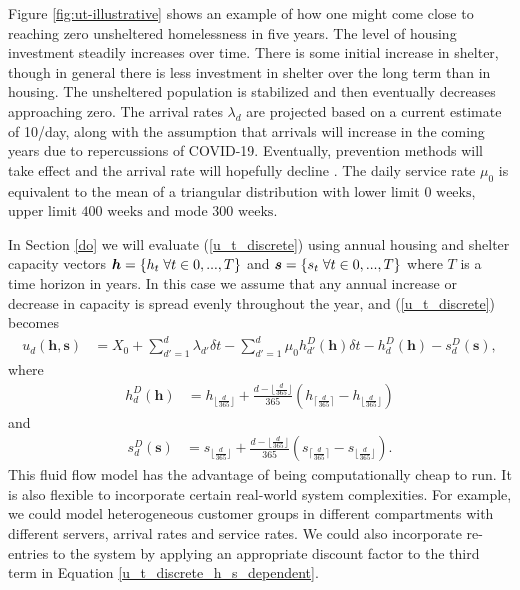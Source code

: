 \documentclass[12pt,a4paper]{article}
\begin{document}
Figure \ref{fig:ut-illustrative} shows an example of how one might come close to reaching zero unsheltered homelessness in five years.  The level of housing investment steadily increases over time.  There is some initial increase in shelter, though in general there is less investment in shelter over the long term than in housing.  The unsheltered population is stabilized and then eventually decreases approaching zero.  The arrival rates $\lambda_d$ are projected based on a current estimate of 10/day, along with the assumption that arrivals will increase in the coming years due to repercussions of COVID-19.  Eventually, prevention methods will take effect and the arrival rate will hopefully decline \citep{hometogether2022}. The daily service rate $\mu_0$ is equivalent to the mean of a triangular distribution with lower limit $0 \text{ weeks}$, upper limit $400 \text{ weeks}$ and mode $300 \text{ weeks}$.

In Section \ref{do} we will evaluate (\ref{u_t_discrete}) using annual housing and shelter capacity vectors $\boldsymbol{h} = \{h_t \hspace{0.1cm} \forall t \in 0,...,T\}$ and $\boldsymbol{s} = \{s_t \hspace{0.1cm} \forall t \in 0,...,T\}$ where $T$ is a time horizon in years. In this case we assume that any annual increase or decrease in capacity is spread evenly throughout the year, and (\ref{u_t_discrete}) becomes
%
\begin{align} \label{u_t_discrete_h_s_dependent}
u_d(\boldsymbol{h},\boldsymbol{s}) & = X_0 + \sum_{d'=1}^{d} \lambda_{d'} \delta t - \sum_{d'=1}^{d} \mu_0 h^D_{d'}(\boldsymbol{h}) \delta t - h^D_d(\boldsymbol{h}) - s^D_d(\boldsymbol{s}),
\end{align}
%
where 
%
\begin{align} \label{h_d}
h^D_d(\boldsymbol{h}) & = h_{\lfloor{\frac{d}{365}}\rfloor} + \frac{d-\lfloor\frac{d}{365}\rfloor}{365}(h_{\lceil{\frac{d}{365}}\rceil}-h_{\lfloor{\frac{d}{365}}\rfloor})
\end{align}
%
and
%
\begin{align} \label{s_d}
s^D_d(\boldsymbol{s}) & = s_{\lfloor{\frac{d}{365}}\rfloor} + \frac{d-\lfloor\frac{d}{365}\rfloor}{365}(s_{\lceil{\frac{d}{365}}\rceil}-s_{\lfloor{\frac{d}{365}}\rfloor}).
\end{align}
%
This fluid flow model has the advantage of being computationally cheap to run. It is also flexible to incorporate certain real-world system complexities. For example, we could model heterogeneous customer groups in different compartments with different servers, arrival rates and service rates. We could also incorporate re-entries to the system by applying an appropriate discount factor to the third term in Equation \ref{u_t_discrete_h_s_dependent}. 
\end{document}
